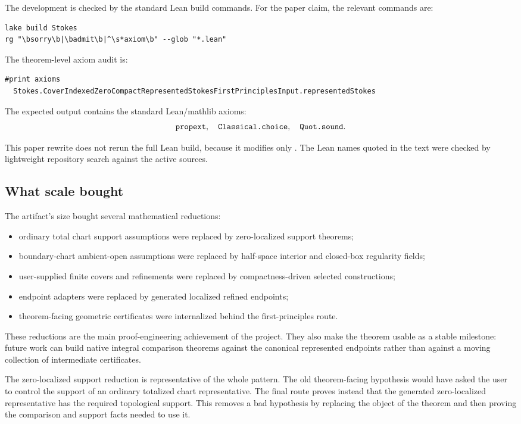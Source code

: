The development is checked by the standard Lean build commands.  For the paper
claim, the relevant commands are:
\begin{lstlisting}
lake build Stokes
rg "\bsorry\b|\badmit\b|^\s*axiom\b" --glob "*.lean"
\end{lstlisting}
The theorem-level axiom audit is:
\begin{lstlisting}
#print axioms
  Stokes.CoverIndexedZeroCompactRepresentedStokesFirstPrinciplesInput.representedStokes
\end{lstlisting}
The expected output contains the standard Lean/mathlib axioms:
\[
\code{propext},\quad \code{Classical.choice},\quad \code{Quot.sound}.
\]

This paper rewrite does not rerun the full Lean build, because it modifies only
.  The Lean names quoted in the text were checked by lightweight
repository search against the active sources.

\subsection{What scale bought}

The artifact's size bought several mathematical reductions:
\begin{itemize}
  \item ordinary total chart support assumptions were replaced by
  zero-localized support theorems;
  \item boundary-chart ambient-open assumptions were replaced by half-space
  interior and closed-box regularity fields;
  \item user-supplied finite covers and refinements were replaced by
  compactness-driven selected constructions;
  \item endpoint adapters were replaced by generated localized refined
  endpoints;
  \item theorem-facing geometric certificates were internalized behind the
  first-principles route.
\end{itemize}

These reductions are the main proof-engineering achievement of the project.
They also make the theorem usable as a stable milestone: future work can build
native integral comparison theorems against the canonical represented
endpoints rather than against a moving collection of intermediate certificates.

The zero-localized support reduction is representative of the whole pattern.
The old theorem-facing hypothesis would have asked the user to control the
support of an ordinary totalized chart representative.  The final route proves
instead that the generated zero-localized representative has the required
topological support.  This removes a bad hypothesis by replacing the object of
the theorem and then proving the comparison and support facts needed to use it.

